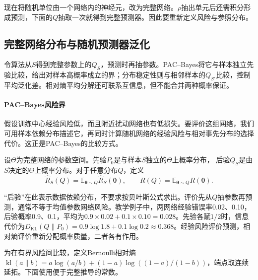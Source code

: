 现在将随机单位由一个网络内的神经元，改为完整网络。$\rho$抽出单元后还需积分形成预测，下面的$Q$抽取一次就得到完整预测器。因此要重新定义风险与参照分布。

\subsection{完整网络分布与随机预测器泛化}
\label{sec:pac-bayes}

令算法从$S$得到完整参数上的$Q_S$，预测时再抽参数。PAC--Bayes将它与样本独立先验比较，给出对样本高概率成立的界；分布稳定性则与相邻样本的$Q_{S'}$比较，控制平均泛化差。相对熵平均分解还可联系互信息，但不能合并两种概率保证。

\paragraph{PAC--Bayes风险界}

假设训练中心经验风险低，而且附近扰动网络也有低损失。要评价这组网络，我们可用样本依赖分布描述它，再同时计算随机网络的经验风险与相对事先分布的选择代价。这正是PAC--Bayes的比较方式。

\begin{definition}
\label{def:pac-bayes-distributions}
设$\Theta$为完整网络的参数空间。先验$P_0$是与样本$S$独立的$\Theta$上概率分布，
后验$Q_S$是由$S$决定的$\Theta$上概率分布。对于任意分布$Q$，定义
\[
 \hat R_S(Q)=\mathbb E_{\bm\theta\sim Q}\hat R_S(\bm\theta),
 \qquad R(Q)=\mathbb E_{\bm\theta\sim Q}R(\bm\theta).
\]
\end{definition}

“后验”在此表示数据依赖分布，不要求按贝叶斯公式求出。评价先从$Q$抽参数再预测，通常不等于均值参数网络风险。教学例子中，两网络经验错误率0.02、0.10，后验概率0.9、0.1，平均为$0.9\times0.02+0.1\times0.10=0.028$。先验各赋$1/2$时，信息代价为$D_{\mathrm{KL}}(Q\|P_0)=0.9\log1.8+0.1\log0.2\approx0.368$。经验风险评价预测，相对熵评价重新分配概率质量，二者各有作用。

为在有界风险间比较，定义Bernoulli相对熵$\operatorname{kl}(a\|b)=a\log(a/b)+(1-a)\log((1-a)/(1-b))$，端点取连续延拓。下面使用便于完整推导的常数。

